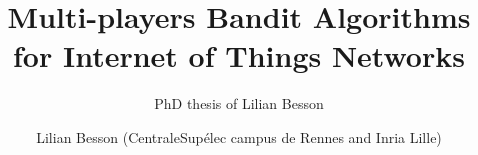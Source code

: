 \documentclass[a4paper,12pt,twoside,index,PageStyleII,print]{0-Misc/PhDThesisPSnPDF}
\title{Multi-players Bandit Algorithms for Internet of Things Networks}
\subtitle{PhD thesis of Lilian Besson}
\author{Lilian Besson (CentraleSupélec campus de Rennes and Inria Lille)}
\begin{document}
	\frontmatter
	

	\begin{small}   %
		\begin{spacing}{1}
			\dominitoc
			\tableofcontents
		\end{spacing}
	\end{small}   %

	\mainmatter

	



	\begin{small}   %

	\begin{spacing}{0.93}
		
		\printnomenclature[8em]
		\label{chapter:nomenclature}
	\end{spacing}


	\begin{spacing}{0.93}
		
		\cleardoublepage
		
	\end{spacing}

	\end{small}   %


	\backmatter
	\cleartoleftpage

	
\end{document}

